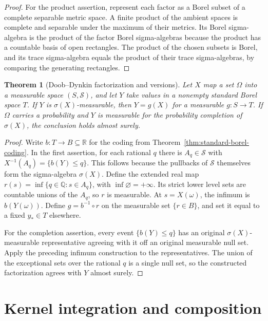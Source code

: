 \documentclass[11pt,oneside,openany]{book}
\theoremstyle{plain}
\newtheorem{theorem}{Theorem}[chapter]
\theoremstyle{definition}
\theoremstyle{remark}
\begin{document}
\begin{proof}
For the product assertion, represent each factor as a Borel subset of a complete separable metric space. A finite product of the ambient spaces is complete and separable under the maximum of their metrics. Its Borel sigma-algebra is the product of the factor Borel sigma-algebras because the product has a countable basis of open rectangles. The product of the chosen subsets is Borel, and its trace sigma-algebra equals the product of their trace sigma-algebras, by comparing the generating rectangles.
\end{proof}

\begin{theorem}[Doob--Dynkin factorization and versions]\label{thm:doob-dynkin}
Let \(X\) map a set \(\Omega\) into a measurable space \((S,\mathcal S)\), and let \(Y\) take values in a nonempty standard Borel space \(T\). If \(Y\) is \(\sigma(X)\)-measurable, then \(Y=g(X)\) for a measurable \(g:S\to T\). If \(\Omega\) carries a probability and \(Y\) is measurable for the probability completion of \(\sigma(X)\), the conclusion holds almost surely.
\end{theorem}
\begin{proof}
Write \(b:T\to B\subseteq\mathbb R\) for the coding from Theorem~\ref{thm:standard-borel-coding}. In the first assertion, for each rational \(q\) there is \(A_q\in\mathcal S\) with \(X^{-1}(A_q)=\{b(Y)\le q\}\). This follows because the pullbacks of \(\mathcal S\) themselves form the sigma-algebra \(\sigma(X)\). Define the extended real map \(r(s)=\inf\{q\in\mathbb Q:s\in A_q\}\), with \(\inf\varnothing=+\infty\). Its strict lower level sets are countable unions of the \(A_q\), so \(r\) is measurable. At \(s=X(\omega)\), the infimum is \(b(Y(\omega))\). Define \(g=b^{-1}\circ r\) on the measurable set \(\{r\in B\}\), and set it equal to a fixed \(y_*\in T\) elsewhere.

For the completion assertion, every event \(\{b(Y)\le q\}\) has an original \(\sigma(X)\)-measurable representative agreeing with it off an original measurable null set. Apply the preceding infimum construction to the representatives. The union of the exceptional sets over the rational \(q\) is a single null set, so the constructed factorization agrees with \(Y\) almost surely.
\end{proof}

\section{Kernel integration and composition}\label{p04-02}
\end{document}
